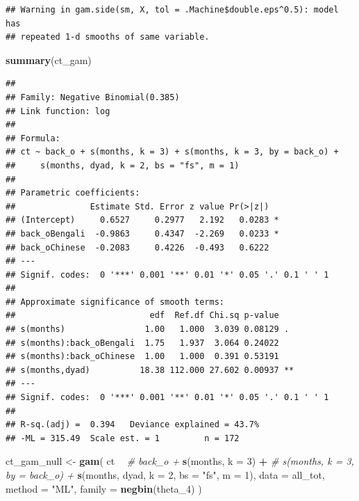 \documentclass[]{article}
\newenvironment{Shaded}{\begin{snugshade}}{\end{snugshade}}
\newcommand{\CommentTok}[1]{\textcolor[rgb]{0.56,0.35,0.01}{\textit{#1}}}
\newcommand{\DataTypeTok}[1]{\textcolor[rgb]{0.13,0.29,0.53}{#1}}
\newcommand{\DecValTok}[1]{\textcolor[rgb]{0.00,0.00,0.81}{#1}}
\newcommand{\KeywordTok}[1]{\textcolor[rgb]{0.13,0.29,0.53}{\textbf{#1}}}
\newcommand{\NormalTok}[1]{#1}
\newcommand{\OperatorTok}[1]{\textcolor[rgb]{0.81,0.36,0.00}{\textbf{#1}}}
\newcommand{\StringTok}[1]{\textcolor[rgb]{0.31,0.60,0.02}{#1}}
\begin{document}
\begin{verbatim}
## Warning in gam.side(sm, X, tol = .Machine$double.eps^0.5): model has
## repeated 1-d smooths of same variable.
\end{verbatim}

\begin{Shaded}
\begin{Highlighting}[]
\KeywordTok{summary}\NormalTok{(ct_gam)}
\end{Highlighting}
\end{Shaded}

\begin{verbatim}
## 
## Family: Negative Binomial(0.385) 
## Link function: log 
## 
## Formula:
## ct ~ back_o + s(months, k = 3) + s(months, k = 3, by = back_o) + 
##     s(months, dyad, k = 2, bs = "fs", m = 1)
## 
## Parametric coefficients:
##               Estimate Std. Error z value Pr(>|z|)  
## (Intercept)     0.6527     0.2977   2.192   0.0283 *
## back_oBengali  -0.9863     0.4347  -2.269   0.0233 *
## back_oChinese  -0.2083     0.4226  -0.493   0.6222  
## ---
## Signif. codes:  0 '***' 0.001 '**' 0.01 '*' 0.05 '.' 0.1 ' ' 1
## 
## Approximate significance of smooth terms:
##                           edf  Ref.df Chi.sq p-value   
## s(months)                1.00   1.000  3.039 0.08129 . 
## s(months):back_oBengali  1.75   1.937  3.064 0.24022   
## s(months):back_oChinese  1.00   1.000  0.391 0.53191   
## s(months,dyad)          18.38 112.000 27.602 0.00937 **
## ---
## Signif. codes:  0 '***' 0.001 '**' 0.01 '*' 0.05 '.' 0.1 ' ' 1
## 
## R-sq.(adj) =  0.394   Deviance explained = 43.7%
## -ML = 315.49  Scale est. = 1         n = 172
\end{verbatim}

\begin{Shaded}
\begin{Highlighting}[]
\NormalTok{ct_gam_null <-}\StringTok{ }\KeywordTok{gam}\NormalTok{(}
\NormalTok{  ct }\OperatorTok{~}
\StringTok{    }\CommentTok{# back_o +}
\StringTok{    }\KeywordTok{s}\NormalTok{(months, }\DataTypeTok{k =} \DecValTok{3}\NormalTok{) }\OperatorTok{+}
\StringTok{    }\CommentTok{# s(months, k = 3, by = back_o) +}
\StringTok{    }\KeywordTok{s}\NormalTok{(months, dyad, }\DataTypeTok{k =} \DecValTok{2}\NormalTok{, }\DataTypeTok{bs =} \StringTok{"fs"}\NormalTok{, }\DataTypeTok{m =} \DecValTok{1}\NormalTok{),}
  \DataTypeTok{data =}\NormalTok{ all_tot,}
  \DataTypeTok{method =} \StringTok{"ML"}\NormalTok{,}
  \DataTypeTok{family =} \KeywordTok{negbin}\NormalTok{(theta_}\DecValTok{4}\NormalTok{)}
\NormalTok{)}
\end{Highlighting}
\end{Shaded}
\end{document}
